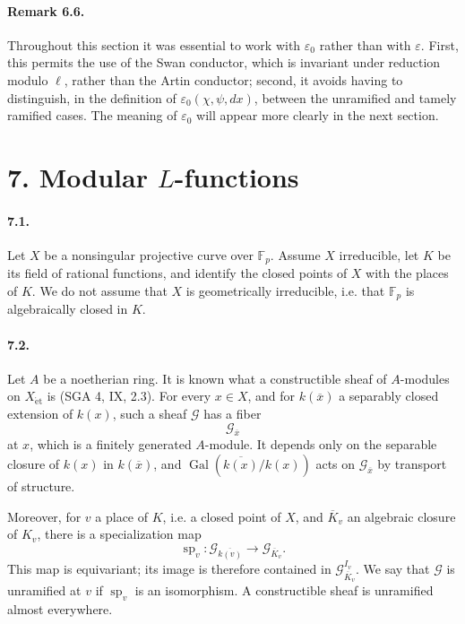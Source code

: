 \documentclass[10pt,letterpaper]{article}
\newcommand{\F}{\mathbb F}
\newcommand{\Gal}{\operatorname{Gal}}
\providecommand{\spc}{\operatorname{sp}}
\providecommand{\Gal}{\operatorname{Gal}}
\providecommand{\spc}{\operatorname{sp}}
\providecommand{\Gal}{\operatorname{Gal}}
\providecommand{\Gal}{\operatorname{Gal}}
\providecommand{\spc}{\operatorname{sp}}
\providecommand{\Gal}{\operatorname{Gal}}
\begin{document}
\paragraph{Remark 6.6.} Throughout this section it was essential to work with \(\varepsilon_0\) rather than with \(\varepsilon\). First, this permits the use of the Swan conductor, which is invariant under reduction modulo \(\ell\), rather than the Artin conductor; second, it avoids having to distinguish, in the definition of \(\varepsilon_0(\chi,\psi,dx)\), between the unramified and tamely ramified cases. The meaning of \(\varepsilon_0\) will appear more clearly in the next section.

\section*{7. Modular \(L\)-functions}

\paragraph{7.1.} Let \(X\) be a nonsingular projective curve over \(\F_p\). Assume \(X\) irreducible, let \(K\) be its field of rational functions, and identify the closed points of \(X\) with the places of \(K\). We do not assume that \(X\) is geometrically irreducible, i.e. that \(\F_p\) is algebraically closed in \(K\).

\paragraph{7.2.} Let \(A\) be a noetherian ring. It is known what a constructible sheaf of \(A\)-modules on \(X_{\mathrm{\acute et}}\) is (SGA 4, IX, 2.3). For every \(x\in X\), and for \(k(\overline x)\) a separably closed extension of \(k(x)\), such a sheaf \(\mathcal G\) has a fiber
\[
\mathcal G_{\overline x}
\]
at \(x\), which is a finitely generated \(A\)-module. It depends only on the separable closure of \(k(x)\) in \(k(\overline x)\), and \(\Gal(\overline{k(x)}/k(x))\) acts on \(\mathcal G_{\overline x}\) by transport of structure.

Moreover, for \(v\) a place of \(K\), i.e. a closed point of \(X\), and \(\overline K_v\) an algebraic closure of \(K_v\), there is a specialization map
\[
\spc_v:\mathcal G_{\overline{k(v)}}\longrightarrow \mathcal G_{\overline K_v}.
\]
This map is equivariant; its image is therefore contained in \(\mathcal G_{\overline K_v}^{I_v}\). We say that \(\mathcal G\) is unramified at \(v\) if \(\spc_v\) is an isomorphism. A constructible sheaf is unramified almost everywhere.
\end{document}
